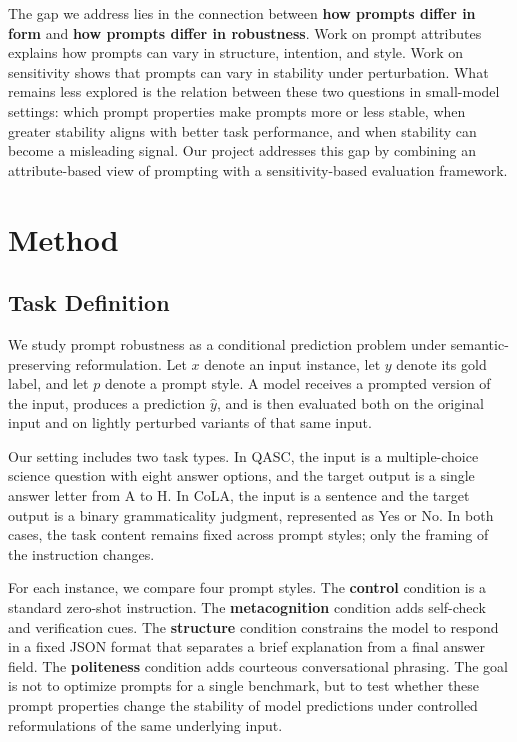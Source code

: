 \documentclass[11pt]{article}
\begin{document}
The gap we address lies in the connection between \textbf{how prompts differ in form} and \textbf{how prompts differ in robustness}. Work on prompt attributes explains how prompts can vary in structure, intention, and style. Work on sensitivity shows that prompts can vary in stability under perturbation. What remains less explored is the relation between these two questions in small-model settings: which prompt properties make prompts more or less stable, when greater stability aligns with better task performance, and when stability can become a misleading signal. Our project addresses this gap by combining an attribute-based view of prompting with a sensitivity-based evaluation framework.

\section{Method}

\subsection{Task Definition}

We study prompt robustness as a conditional prediction problem under semantic-preserving reformulation. Let $x$ denote an input instance, let $y$ denote its gold label, and let $p$ denote a prompt style. A model receives a prompted version of the input, produces a prediction $\hat{y}$, and is then evaluated both on the original input and on lightly perturbed variants of that same input.

Our setting includes two task types. In QASC, the input is a multiple-choice science question with eight answer options, and the target output is a single answer letter from A to H. In CoLA, the input is a sentence and the target output is a binary grammaticality judgment, represented as Yes or No. In both cases, the task content remains fixed across prompt styles; only the framing of the instruction changes.

For each instance, we compare four prompt styles. The \textbf{control} condition is a standard zero-shot instruction. The \textbf{metacognition} condition adds self-check and verification cues. The \textbf{structure} condition constrains the model to respond in a fixed JSON format that separates a brief explanation from a final answer field. The \textbf{politeness} condition adds courteous conversational phrasing. The goal is not to optimize prompts for a single benchmark, but to test whether these prompt properties change the stability of model predictions under controlled reformulations of the same underlying input.
\end{document}
